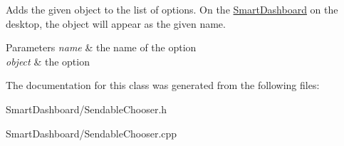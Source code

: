 \label{classSendableChooser_aacaffd7663116d16ef33f2d0d0964c9f}
Adds the given object to the list of options. On the \hyperlink{classSmartDashboard}{SmartDashboard} on the desktop, the object will appear as the given name. 
\begin{DoxyParams}{Parameters}
{\em name} & the name of the option \\
\hline
{\em object} & the option \\
\hline
\end{DoxyParams}


The documentation for this class was generated from the following files:\begin{DoxyCompactItemize}
\item 
SmartDashboard/SendableChooser.h\item 
SmartDashboard/SendableChooser.cpp\end{DoxyCompactItemize}
